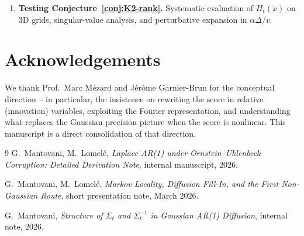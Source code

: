 \documentclass[11pt,a4paper]{article}
\theoremstyle{plainserif}
\theoremstyle{definition}
\theoremstyle{remarkstyle}
\begin{document}
\begin{enumerate}[leftmargin=2em]
\item \textbf{Testing Conjecture~\ref{conj:K2-rank}.} Systematic
evaluation of $H_t(x)$ on $3$D grids, singular-value analysis,
and perturbative expansion in $\alpha\Delta/v$.
\end{enumerate}

\section*{Acknowledgements}
We thank Prof.\ Marc M\'ezard and J\'er\^ome Garnier-Brun for the
conceptual direction -- in particular, the insistence on rewriting the
score in relative (innovation) variables, exploiting the Fourier
representation, and understanding what replaces the Gaussian precision
picture when the score is nonlinear. This manuscript is a direct
consolidation of that direction.

\begin{thebibliography}{9}
G.~Mantovani, M.~Lomel\'e,
\emph{Laplace AR(1) under Ornstein--Uhlenbeck Corruption:
Detailed Derivation Note}, internal manuscript, 2026.

G.~Mantovani, M.~Lomel\'e,
\emph{Markov Locality, Diffusion Fill-In, and the First Non-Gaussian
Route}, short presentation note, March 2026.

G.~Mantovani,
\emph{Structure of $\Sigma_t$ and $\Sigma_t^{-1}$ in Gaussian AR(1)
Diffusion}, internal note, 2026.
\end{thebibliography}
\end{document}
